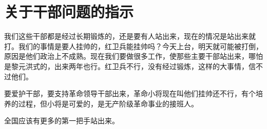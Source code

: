 \section[关于干部问题的指示（一九六七年六月）]{关于干部问题的指示}


我们这些干部都是经过长期锻炼的，还是要有人站出来，现在的情况是站出来就打。我们的事情是要人挂帅的，红卫兵能挂帅吗？今天上台，明天就可能被打倒，原因是他们政治上不成熟。现在我们要做很多工作，使那些主要干部站出来，哪怕是黎元洪式的，出来两年也行。红卫兵不行，没有经过锻炼，这样的大事情，信不过他们。


要爱护干部，要支持革命领导干部出来，革命小将现在叫他们挂帅还不行，有个培养的过程，但小将是可爱的，是无产阶级革命事业的接班人。


全国应该有更多的第一把手站出来。

